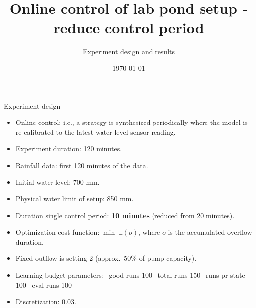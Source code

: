 \documentclass[notheorems,aspectratio=169]{beamer}
\title{Online control of lab pond setup - reduce control period}
\subtitle{Experiment design and results}
\date{\today}
\begin{document}
%
\begin{frame}
	\titlepage
\end{frame}
%

\begin{frame}{Experiment design}
	\small
	\begin{itemize}
		\item Online control: i.e., a strategy is synthesized periodically where the model is re-calibrated to the latest water level sensor reading.
		\item Experiment duration: 120 minutes.
		\item Rainfall data: first 120 minutes of the data.
		\item Initial water level: 700 mm.
		\item Physical water limit of setup: 850 mm.
		\item Duration single control period: \textbf{10 minutes} (reduced from 20 minutes).
		\item Optimization cost function: $\min\  \mathbb{E}(o)$, where $o$ is the accumulated overflow duration.
		\item Fixed outflow is setting 2 (approx.\ 50\% of pump capacity).
		\item Learning budget parameters: --good-runs 100 --total-runs 150 --runs-pr-state 100 --eval-runs 100 
		\item Discretization: 0.03.
	\end{itemize}
\end{frame}
\end{document}

